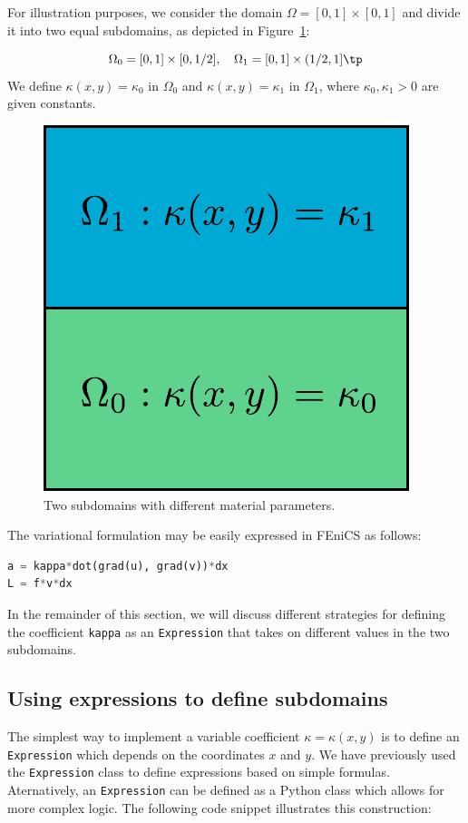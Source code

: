 \documentclass[graybox,envcountchap,sectrefs,final]{svmonodo}
\begin{document}
For illustration purposes, we consider the domain $\Omega =
[0,1]\times [0,1]$ and divide it into two equal subdomains, as
depicted in Figure~\ref{fig:subdomains}:

\begin{equation*}
\Omega_0 = [0, 1]\times [0,1/2],\quad
\Omega_1 = [0, 1]\times (1/2,1]\tp
\end{equation*}
We define $\kappa(x,y)=\kappa_0$ in $\Omega_0$ and $\kappa(x,y)=\kappa_1$ in $\Omega_1$,
where $\kappa_0, \kappa_1 > 0$ are given constants.


\begin{figure}[!ht]  %
  \centerline{\includegraphics[width=0.5\linewidth]{fig/subdomains.pdf}}
  \caption{
  Two subdomains with different material parameters. \label{fig:subdomains}
  }
\end{figure}


The variational formulation may be easily expressed in FEniCS as
follows:
\begin{lstlisting}[language=Python,style=graycolor]
a = kappa*dot(grad(u), grad(v))*dx
L = f*v*dx
\end{lstlisting}
In the remainder of this section, we will discuss different strategies
for defining the coefficient \texttt{kappa} as an \texttt{Expression} that takes on
different values in the two subdomains.

\subsection{Using expressions to define subdomains}

The simplest way to implement a variable coefficient $\kappa =
\kappa(x, y)$ is to define an \texttt{Expression} which depends on the
coordinates $x$ and $y$. We have previously used the \texttt{Expression}
class to define expressions based on simple formulas. Aternatively,
an \texttt{Expression} can be defined as a Python class which allows for more
complex logic. The following code snippet illustrates this
construction:
\end{document}
